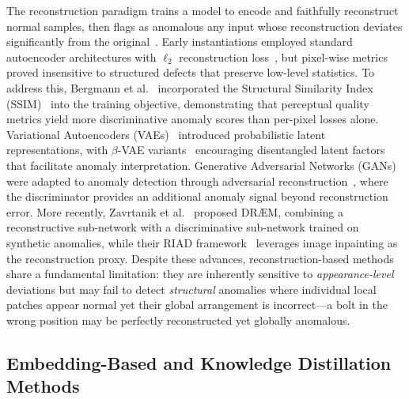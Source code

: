 \documentclass[lettersize,journal]{IEEEtran}
\begin{document}
The reconstruction paradigm trains a model to encode and faithfully reconstruct normal samples, then flags as anomalous any input whose reconstruction deviates significantly from the original~\cite{bergmann2019improving}. Early instantiations employed standard autoencoder architectures with $\ell_2$ reconstruction loss~\cite{zhou2017anomaly}, but pixel-wise metrics proved insensitive to structured defects that preserve low-level statistics. To address this, Bergmann et al.~\cite{bergmann2019improving} incorporated the Structural Similarity Index (SSIM)~\cite{wang2004ssim} into the training objective, demonstrating that perceptual quality metrics yield more discriminative anomaly scores than per-pixel losses alone. Variational Autoencoders (VAEs)~\cite{kingma2014vae} introduced probabilistic latent representations, with $\beta$-VAE variants~\cite{higgins2017betavae} encouraging disentangled latent factors that facilitate anomaly interpretation. Generative Adversarial Networks (GANs)~\cite{goodfellow2014gan} were adapted to anomaly detection through adversarial reconstruction~\cite{schlegl2017anogan,akcay2018ganomaly}, where the discriminator provides an additional anomaly signal beyond reconstruction error. More recently, Zavrtanik et al.~\cite{zavrtanik2021drae} proposed DR\AE M, combining a reconstructive sub-network with a discriminative sub-network trained on synthetic anomalies, while their RIAD framework~\cite{zavrtanik2021riad} leverages image inpainting as the reconstruction proxy. Despite these advances, reconstruction-based methods share a fundamental limitation: they are inherently sensitive to \textit{appearance-level} deviations but may fail to detect \textit{structural} anomalies where individual local patches appear normal yet their global arrangement is incorrect---a bolt in the wrong position may be perfectly reconstructed yet globally anomalous.

\subsection{Embedding-Based and Knowledge Distillation Methods}
\end{document}
